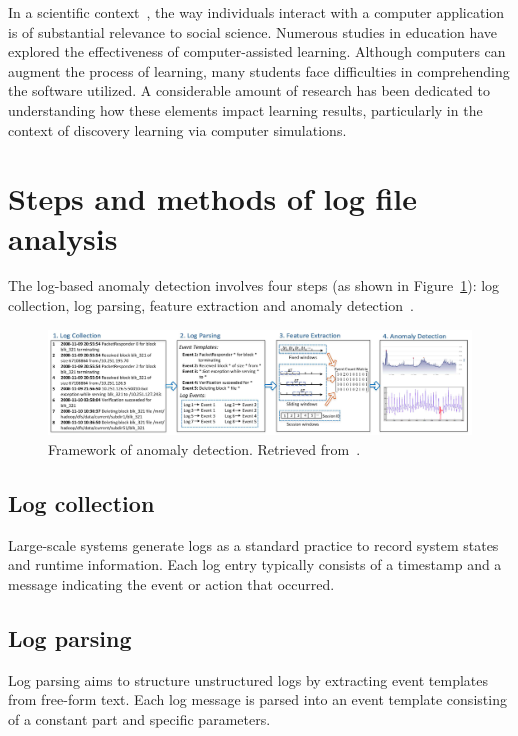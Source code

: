 In a scientific context~\cite{hulshof2005logfile}, the way individuals interact with a computer application is of substantial relevance to social science. Numerous studies in education have explored the effectiveness of computer-assisted learning. Although computers can augment the process of learning, many students face difficulties in comprehending the software utilized. A considerable amount of research has been dedicated to understanding how these elements impact learning results, particularly in the context of discovery learning via computer simulations.

\section{Steps and methods of log file analysis}
\label{sec:steps}
The log-based anomaly detection involves four steps (as shown in Figure~\ref{fig:anomaly-detection}): log collection, log parsing, feature extraction and anomaly detection~\cite{he2016expreport}.

\begin{figure}[H]
    \centering
    \includegraphics[width=\linewidth]{figures/anomaly-detection.png}
    \caption{Framework of anomaly detection. Retrieved from~\cite{he2016expreport}.}
    \label{fig:anomaly-detection}
\end{figure}

\subsection{Log collection}
Large-scale systems generate logs as a standard practice to record system states and runtime information. Each log entry typically consists of a timestamp and a message indicating the event or action that occurred.~\cite{he2016expreport}

\subsection{Log parsing}
Log parsing aims to structure unstructured logs by extracting event templates from free-form text. Each log message is parsed into an event template consisting of a constant part and specific parameters.~\cite{he2016expreport}

